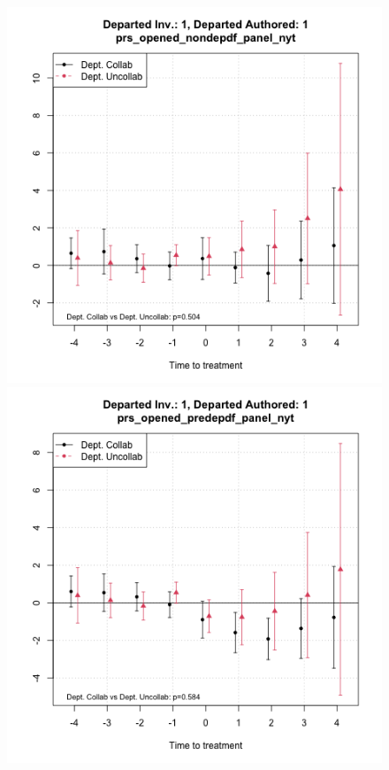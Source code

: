 \begin{figure}[htbp]
    \centering
    \begin{minipage}[b]{0.49\textwidth}
        \centering
        \includegraphics[width=\textwidth]{temp/output/collab_imp/auth_n1_inv_n1_cs_norm_prs_opened_nondep.png}
    \end{minipage}
    \hfill
    \begin{minipage}[b]{0.49\textwidth}
        \centering
        \includegraphics[width=\textwidth]{temp/output/collab_imp/auth_n1_inv_n1_cs_norm_prs_opened_predep.png}

\end{minipage}
\end{figure}
